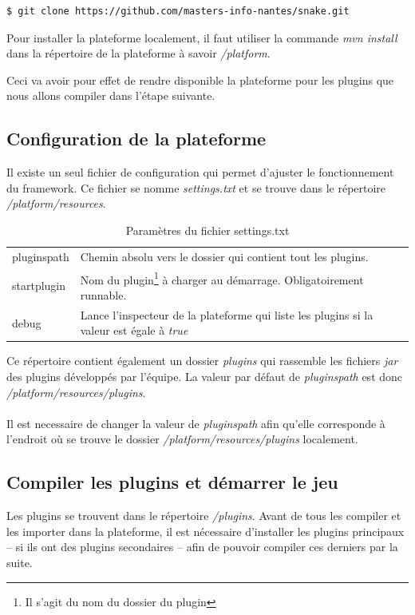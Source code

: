 \documentclass[12pt,a4paper]{article}
\begin{document}
\begin{lstlisting}[language=bash,caption=Télécharger le projet]
$ git clone https://github.com/masters-info-nantes/snake.git
\end{lstlisting}

Pour installer la plateforme localement, il faut utiliser la commande 
\og{}\emph{mvn install}\fg{} dans la répertoire de la plateforme à savoir 
\emph{/platform}.

Ceci va avoir pour effet de rendre disponible la plateforme pour les plugins 
que nous allons compiler dans l'étape suivante.

\subsection{Configuration de la plateforme}
Il existe un seul fichier de configuration qui permet d'ajuster le fonctionnement 
du framework. Ce fichier se nomme \emph{settings.txt} et se trouve dans le 
répertoire \emph{/platform/resources}.

\begin{table}[h]
\centering
	\begin{tabular}{lp{9cm}}
		pluginspath & Chemin absolu vers le dossier qui contient tout les plugins.\\
					 
		startplugin & Nom du plugin\footnote{Il s'agit du nom du dossier du 
		plugin} à charger au démarrage. Obligatoirement runnable.\\	
		
		debug & Lance l'inspecteur de la plateforme qui liste les plugins si la valeur 
		est égale à \emph{true}				 
	\end{tabular}	
\caption{Paramètres du fichier settings.txt}
\end{table}
	
Ce répertoire contient également un dossier \emph{plugins} qui rassemble les fichiers 
\emph{jar} des plugins développés par l'équipe. La valeur par défaut de 
\emph{pluginspath} est donc \emph{/platform/resources/plugins}.
\\\\
Il est necessaire de changer la valeur de \emph{pluginspath} afin qu'elle corresponde 
à l'endroit où se trouve le dossier \emph{/platform/resources/plugins} localement.

\subsection{Compiler les plugins et démarrer le jeu}
Les plugins se trouvent dans le répertoire \emph{/plugins}. Avant de tous les compiler 
et les importer dans la plateforme, il est nécessaire d'installer les plugins 
principaux -- si ils ont des plugins secondaires -- afin de pouvoir compiler 
ces derniers par la suite.
\end{document}
